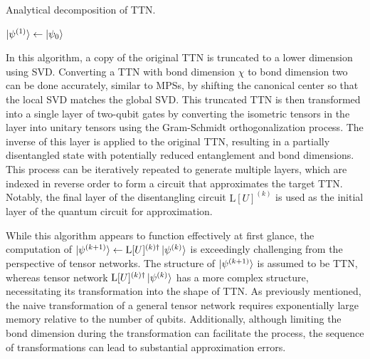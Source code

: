 \documentclass[12pt,dvipdfmx,twoside,openright]{report}
\begin{document}
\begin{algorithm}[tbp]
 \caption{Analytical decomposition of TTN.}
 \label{algorithm:decomposition}
 $\ket{\psi^{(1)}} \leftarrow{\ket{\psi_0}}$\;
\end{algorithm}

In this algorithm, a copy of the original TTN is truncated to a lower dimension using SVD.
Converting a TTN with bond dimension $\chi$ to bond dimension two can be done accurately, similar to MPSs, by shifting the canonical center so that the local SVD matches the global SVD.
This truncated TTN is then transformed into a single layer of two-qubit gates by converting the isometric tensors in the layer into unitary tensors using the Gram-Schmidt orthogonalization process.
 The inverse of this layer is applied to the original TTN, resulting in a partially disentangled state with potentially reduced entanglement and bond dimensions.
This process can be iteratively repeated to generate multiple layers, which are indexed in reverse order to form a circuit that approximates the target TTN. 
Notably, the final layer of the disentangling circuit $\mathrm{L}[U]^{(k)}$ is used as the initial layer of the quantum circuit for approximation.

While this algorithm appears to function effectively at first glance, the computation of $\ket{\psi^{(k+1)}} \leftarrow{\mathrm{L}[U]^{(k)\dagger}}\ket{\psi^{(k)}}$ is exceedingly challenging from the perspective of tensor networks.
The structure of $\ket{\psi^{(k+1)}}$ is assumed to be TTN, whereas tensor network $\mathrm{L}[U]^{(k)\dagger}\ket{\psi^{(k)}}$ has a more complex structure, necessitating its transformation into the shape of TTN.
As previously mentioned, the naive transformation of a general tensor network requires exponentially large memory relative to the number of qubits.
Additionally, although limiting the bond dimension during the transformation can facilitate the process, the sequence of transformations can lead to substantial approximation errors.
\end{document}
